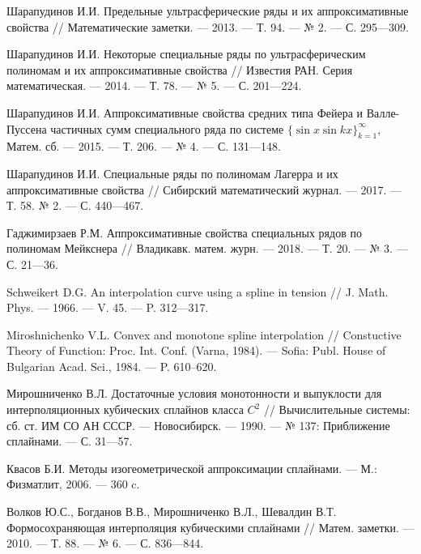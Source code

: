 \begin{thebibliography}{111}
Шарапудинов И.И. Предельные ультрасферические ряды и их
аппроксимативные свойства // Математические заметки. --- 2013. --- Т. 94. --- № 2. --- С. 295---309.



Шарапудинов И.И. Некоторые специальные ряды по ультрасферическим полиномам  и их аппроксимативные свойства //
Известия РАН. Серия математическая. --- 2014. --- Т. 78. --- № 5. --- С. 201---224.



Шарапудинов И.И. Аппроксимативные свойства средних типа Фейера и Валле-Пуссена частичных сумм специального ряда по системе $\{ \sin x\sin kx\}_{k=1}^\infty$, Матем. сб. --- 2015. --- Т. 206. --- № 4. --- С. 131---148.



{Шарапудинов И.И.}
Специальные ряды по полиномам Лагерра и их аппроксимативные свойства // Сибирский математический журнал. --- 2017. --- Т. 58. № 2. --- С. 440---467.




{Гаджимирзаев Р.М.} Аппроксимативные свойства специальных рядов по полиномам Мейкснера // Владикавк. матем. журн. --- 2018. --- Т. 20. --- № 3. --- С. 21---36.



Schweikert D.G. An interpolation curve using a spline in tension
// J. Math. Phys. --- 1966. --- V. 45. --- P. 312---317.




Miroshnichenko V.L. Convex and monotone spline interpolation
// Constuctive Theory of Function: Proc. Int. Conf. (Varna, 1984). --- Sofia:
Publ. House of Bulgarian Acad. Sci., 1984. --- P. 610--620.



Мирошниченко В.Л. Достаточные условия монотонности и выпуклости
для интерполяционных кубических сплайнов класса $C^2$
// Вычислительные системы: сб. ст. ИМ СО АН СССР. ---
Новосибирск. --- 1990. --- № 137: Приближение сплайнами. --- С. 31---57.



Квасов Б.И. Методы изогеометрической аппроксимации сплайнами. --- М.: Физматлит, 2006. --- 360 c.



Волков Ю.С., Богданов В.В., Мирошниченко В.Л., Шевалдин В.Т.
Формосохраняющая интерполяция кубическими сплайнами // Матем. заметки. --- 2010. --- Т. 88. --- № 6. --- С. 836---844.




\end{thebibliography}
